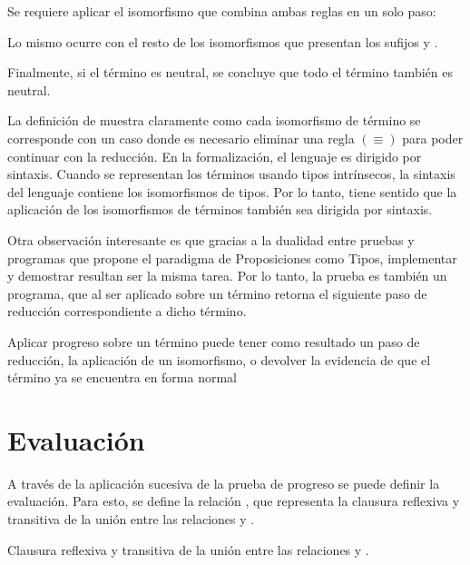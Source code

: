 Se requiere aplicar el isomorfismo  que combina ambas reglas en un solo paso:


Lo mismo ocurre con el resto de los isomorfismos que presentan los sufijos  y \const{$\eta$}.

Finalmente, si el término  es neutral, se concluye que todo el término también es neutral.

La definición de  muestra claramente como cada isomorfismo de término se corresponde con un caso donde es necesario eliminar una regla $(\equiv)$ para poder continuar con la reducción.
En la formalización, el lenguaje es dirigido por sintaxis.
Cuando se representan los términos usando tipos intrínsecos, la sintaxis del lenguaje contiene los isomorfismos de tipos.
Por lo tanto, tiene sentido que la aplicación de los isomorfismos de términos también sea dirigida por sintaxis.

Otra observación interesante es que gracias a la dualidad entre pruebas y programas que propone el paradigma de Proposiciones como Tipos, implementar y demostrar resultan ser la misma tarea.
Por lo tanto, la prueba  es también un programa, que al ser aplicado sobre un término retorna el siguiente paso de reducción correspondiente a dicho término.

\begin{example}
	Aplicar progreso sobre un término puede tener como resultado un paso de reducción, la aplicación de un isomorfismo, o devolver la evidencia de que el término ya se encuentra en forma normal
\end{example}

\section{Evaluación}

A través de la aplicación sucesiva de la prueba de progreso se puede definir la evaluación.
Para esto, se define la relación \type{$\_\rightsquigarrow\_$}, que representa la clausura reflexiva y transitiva de la unión entre las relaciones \type{$\_\hookrightarrow\_$} y \type{$\_\rightleftarrows\_$}.

\begin{codigo}
	Clausura reflexiva y transitiva de la unión entre las relaciones \type{$\_\hookrightarrow\_$} y \type{$\_\rightleftarrows\_$}.
\end{codigo}

